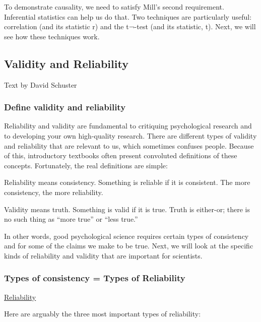 \documentclass[
]{book}
\begin{document}
To demonstrate causality, we need to satisfy Mill's second requirement. Inferential statistics can help us do that. Two techniques are particularly useful: correlation (and its statistic r) and the t¬-test (and its statistic, t). Next, we will see how these techniques work.

\hypertarget{validity-and-reliability}{%
\subsection{Validity and Reliability}\label{validity-and-reliability}}

Text by David Schuster

\hypertarget{define-validity-and-reliability}{%
\subsubsection{Define validity and reliability}\label{define-validity-and-reliability}}

Reliability and validity are fundamental to critiquing psychological research and to developing your own high-quality research. There are different types of validity and reliability that are relevant to us, which sometimes confuses people. Because of this, introductory textbooks often present convoluted definitions of these concepts. Fortunately, the real definitions are simple:

Reliability means consistency. Something is reliable if it is consistent. The more consistency, the more reliability.

Validity means truth. Something is valid if it is true. Truth is either-or; there is no such thing as ``more true'' or ``less true.''

In other words, good psychological science requires certain types of consistency and for some of the claims we make to be true. Next, we will look at the specific kinds of reliability and validity that are important for scientists.

\hypertarget{types-of-consistency-types-of-reliability}{%
\subsubsection{Types of consistency = Types of Reliability}\label{types-of-consistency-types-of-reliability}}

\href{https://youtu.be/EatmTWbD4uo}{Reliability}

Here are arguably the three most important types of reliability:
\end{document}
